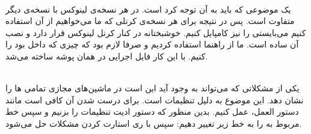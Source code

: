 \\\noindent
یک موضوعی که باید به آن توجه کرد
است.
در هر نسخه‌ی لینوکس با نسخه‌ی دیگر متفاوت است. پس در نتیجه برای هر نسخه‌ی کرنلی که ما می‌خواهیم از آن استفاده
کنیم می‌بایستی
را نیز کامپایل کنیم. خوشبختانه
در کنار کرنل لینوکس قرار دارد و نصب آن ساده است. ما از
راهنما استفاده کردیم و صرفا لازم بود که چیزی که داخل
بود را
کنیم. با این کار فایل اجرایی
در همان پوشه ساخته می‌شد.

\\\noindent
یکی از مشکلاتی که می‌تواند به وجود آید این است در ماشین‌های مجازی
تمامی
ها را
نشان دهد. این موضوع به دلیل تنظیمات
است. برای درست شدن آن کافی است مانند 
دستور العمل،‌ عمل کنیم. بدین منظور که دستور ادیت تنظیمات
را بزنیم و سپس خط مربوط به
را به خط زیر تغییر دهیم:
سپس با ری استارت کردن
مشکلات حل می‌شود.